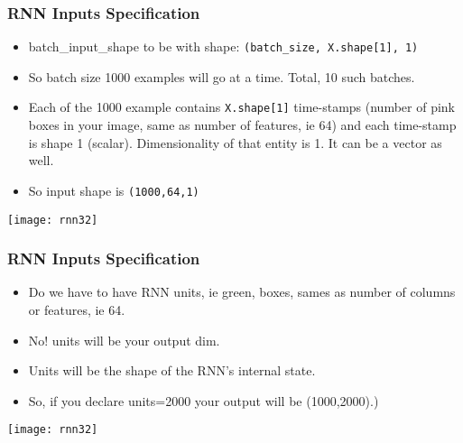 \begin{frame}[fragile] \frametitle{RNN Inputs Specification}
\begin{itemize}
\item batch\_input\_shape to be with shape: \lstinline|(batch_size, X.shape[1], 1)|
\item So batch size 1000 examples will go at a time. Total, 10 such batches.
\item Each of the 1000 example contains \lstinline|X.shape[1]| time-stamps (number of pink boxes in your image, same as number of features, ie 64) and each time-stamp is shape 1 (scalar). Dimensionality of that entity is 1. It can be a vector as well.
\item So input shape is \lstinline|(1000,64,1)|
\end{itemize}

\begin{center}
\texttt{[image: rnn32]}
\end{center}


\end{frame}

\begin{frame}[fragile] \frametitle{RNN Inputs Specification}

\begin{itemize}
\item Do we have to have RNN units, ie green, boxes, sames as number of columns or features, ie 64.
\item No! units will be your output dim.
\item Units will be the shape of the RNN's internal state. 
\item So, if you declare units=2000 your output will be (1000,2000).)
\end{itemize}

\begin{center}
\texttt{[image: rnn32]}
\end{center}


\end{frame}

